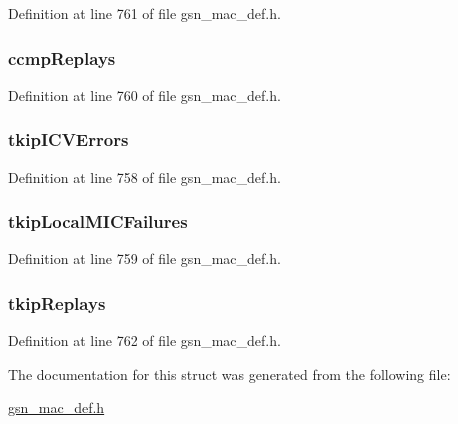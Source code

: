 Definition at line 761 of file gsn\_\-mac\_\-def.h.

\hypertarget{a00129_a57a6c57244417c6aedf9f7a685faf3fe}{
\subsubsection[{ccmpReplays}]{ {\bf ccmpReplays}}}
\label{a00129_a57a6c57244417c6aedf9f7a685faf3fe}


Definition at line 760 of file gsn\_\-mac\_\-def.h.

\hypertarget{a00129_ab0cd1d012826ecea07fc98338dcf659b}{
\subsubsection[{tkipICVErrors}]{ {\bf tkipICVErrors}}}
\label{a00129_ab0cd1d012826ecea07fc98338dcf659b}


Definition at line 758 of file gsn\_\-mac\_\-def.h.

\hypertarget{a00129_a89e64fc1c041a15d2c07729f9a9e839f}{
\subsubsection[{tkipLocalMICFailures}]{ {\bf tkipLocalMICFailures}}}
\label{a00129_a89e64fc1c041a15d2c07729f9a9e839f}


Definition at line 759 of file gsn\_\-mac\_\-def.h.

\hypertarget{a00129_ae7f0fd49eb4fdd75d7ab51c0493d0ffb}{
\subsubsection[{tkipReplays}]{ {\bf tkipReplays}}}
\label{a00129_ae7f0fd49eb4fdd75d7ab51c0493d0ffb}


Definition at line 762 of file gsn\_\-mac\_\-def.h.



The documentation for this struct was generated from the following file:\begin{DoxyCompactItemize}
\item 
\hyperlink{a00522}{gsn\_\-mac\_\-def.h}\end{DoxyCompactItemize}
